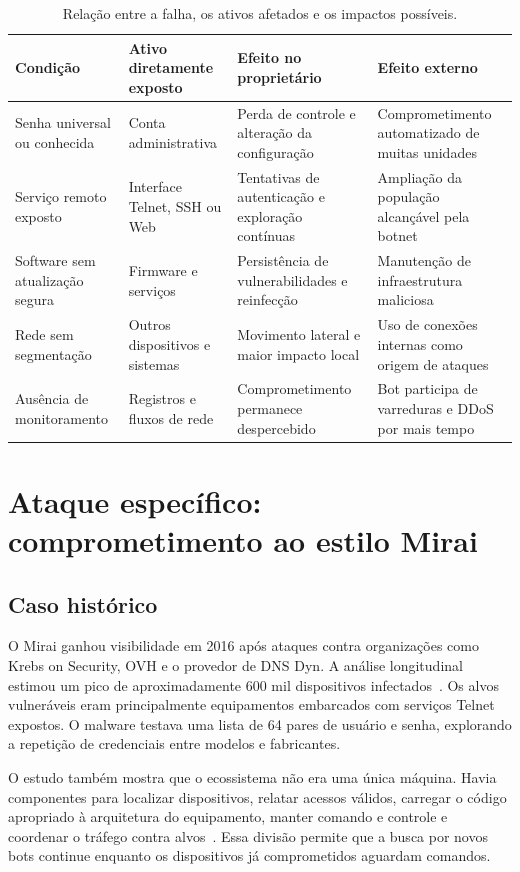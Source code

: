 \documentclass[11pt,a4paper]{article}
\begin{document}
\begin{table}[t]
\centering
\small
\caption{Relação entre a falha, os ativos afetados e os impactos possíveis.}
\label{tab:impactos}
\begin{tabularx}{\textwidth}{L{3.0cm}L{3.1cm}YY}
\toprule
Condição & Ativo diretamente exposto & Efeito no proprietário & Efeito externo \\
\midrule
Senha universal ou conhecida & Conta administrativa & Perda de controle e alteração da configuração & Comprometimento automatizado de muitas unidades \\
Serviço remoto exposto & Interface Telnet, SSH ou Web & Tentativas de autenticação e exploração contínuas & Ampliação da população alcançável pela botnet \\
Software sem atualização segura & Firmware e serviços & Persistência de vulnerabilidades e reinfecção & Manutenção de infraestrutura maliciosa \\
Rede sem segmentação & Outros dispositivos e sistemas & Movimento lateral e maior impacto local & Uso de conexões internas como origem de ataques \\
Ausência de monitoramento & Registros e fluxos de rede & Comprometimento permanece despercebido & Bot participa de varreduras e DDoS por mais tempo \\
\bottomrule
\end{tabularx}
\end{table}

\section{Ataque específico: comprometimento ao estilo Mirai}
\subsection{Caso histórico}
O Mirai ganhou visibilidade em 2016 após ataques contra organizações como Krebs on Security, OVH e o provedor de DNS Dyn. A análise longitudinal estimou um pico de aproximadamente 600 mil dispositivos infectados~\cite{antonakakis2017}. Os alvos vulneráveis eram principalmente equipamentos embarcados com serviços Telnet expostos. O malware testava uma lista de 64 pares de usuário e senha, explorando a repetição de credenciais entre modelos e fabricantes.

O estudo também mostra que o ecossistema não era uma única máquina. Havia componentes para localizar dispositivos, relatar acessos válidos, carregar o código apropriado à arquitetura do equipamento, manter comando e controle e coordenar o tráfego contra alvos~\cite{antonakakis2017}. Essa divisão permite que a busca por novos bots continue enquanto os dispositivos já comprometidos aguardam comandos.
\end{document}

